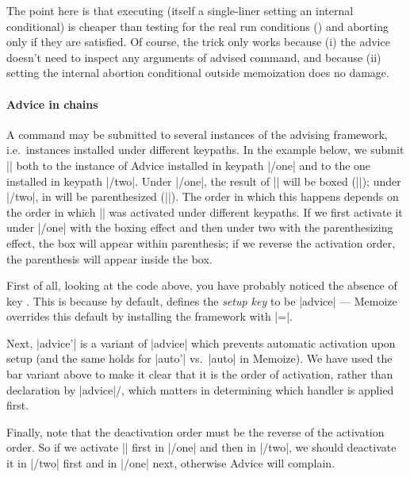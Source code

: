 \documentclass[a4paper,11pt]{article}
\begin{document}
The point here is that executing  (itself a single-liner
setting an internal conditional) is cheaper than testing for the real run
conditions () and aborting only if they are
satisfied.  Of course, the trick only works because (i) the advice doesn't
need to inspect any arguments of advised command, and because (ii) setting the
internal abortion conditional outside memoization does no damage.

\paragraph{Advice in chains}

A command may be submitted to several instances of the advising framework,
i.e.\ instances installed under different keypaths.  In the example below, we
submit |\foo| both to the instance of Advice installed in keypath |/one| and to
the one installed in keypath |/two|.  Under |/one|, the result of ||
will be boxed (|\fboxWrap|); under |/two|, in will be parenthesized
(|\parenWrap|).  The order in which this happens depends on the order in which
|\foo| was activated under different keypaths.  If we first activate it under
|/one| with the boxing effect and then under two with the parenthesizing
effect, the box will appear within parenthesis; if we reverse the activation
order, the parenthesis will appear inside the box.


First of all, looking at the code above, you have probably noticed the absence
of key .  This is because by default,  defines the \emph{setup key} to be |advice| --- Memoize overrides
this default by installing the framework with |=|.

Next, |advice'| is a variant of |advice| which prevents automatic activation
upon setup (and the same holds for |auto'| vs.\ |auto| in Memoize).  We have
used the bar variant above to make it clear that it is the order of activation,
rather than declaration by |advice|\slash {}, which matters in
determining which handler is applied first.

Finally, note that the deactivation order must be the reverse of the activation
order.  So if we activate |\foo| first in |/one| and then in |/two|, we should
deactivate it in |/two| first and in |/one| next, otherwise Advice will
complain.
\end{document}
